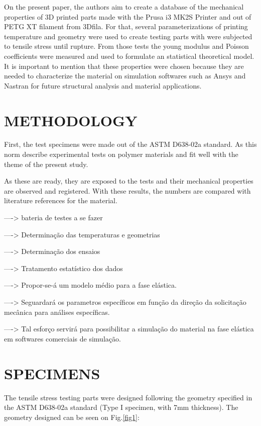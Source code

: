 \documentclass[10pt,fleqn,a4paper,twoside]{article}
\begin{document}
On the present paper, the authors aim to create a database of the mechanical properties of 3D printed parts made with the Prusa i3 MK2S Printer and out of PETG XT filament from 3Dfila. For that, several parameterizations of printing temperature and geometry were used to create testing parts with were subjected to tensile stress until rupture. From those tests the young modulus and Poisson coefficients were measured and used to formulate an statistical theoretical model. It is important to mention that these properties were chosen because they are needed to characterize the material on simulation softwares such as Ansys and Nastran for future structural analysis and material applications.  



\section{METHODOLOGY}

First, the test specimens were made out of the ASTM D638-02a standard. As this norm describe experimental tests on polymer materials and fit well with the theme of the present study.

As these are ready, they are exposed to the tests and their mechanical properties are observed and registered. With these results, the numbers are compared with literature references for the material.

----> bateria de testes a se fazer

----> Determinação das temperaturas e geometrias

----> Determinação dos ensaios
	
----> Tratamento estatístico dos dados

----> Propor-se-á um modelo médio para a fase elástica. 

----> Seguardará os parametros específicos em função da direção da solicitação mecânica para análises específicas.

----> Tal esforço servirá para possibilitar a simulação do material na fase elástica em softwares comerciais de simulação.





\section{SPECIMENS}

The tensile stress testing parts were designed following the geometry specified in the ASTM D638-02a standard (Type I specimen, with 7mm thickness). The geometry designed can be seen on Fig.\ref{fig1}:
\end{document}
